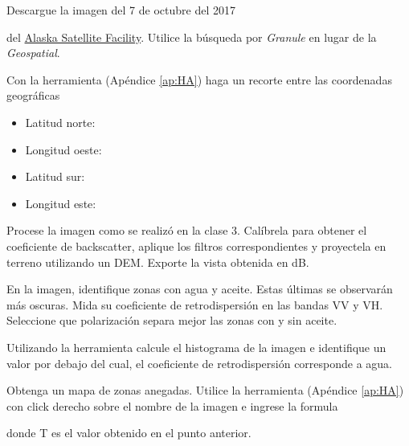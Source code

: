 \begin{que}
    Descargue la imagen del 7 de octubre del 2017
    \begin{center}\end{center} del \href{https://vertex.daac.asf.alaska.edu/}{Alaska Satellite Facility}. Utilice la búsqueda por \emph{Granule} en lugar de la \emph{Geospatial}.
\end{que}

\begin{que}
    Con la herramienta  (Apéndice \ref{ap:HA}) haga un recorte entre las coordenadas geográficas
    \begin{itemize}
        \item Latitud norte:
        \item Longitud oeste:
        \item Latitud sur:
        \item Longitud este:
    \end{itemize}

\end{que}

\begin{que}
    Procese la imagen como se realizó en la clase 3. Calíbrela para obtener el coeficiente de backscatter, aplique los filtros correspondientes y proyectela en terreno utilizando un DEM. Exporte la vista obtenida en dB.
\end{que}

\begin{que}
    En la imagen, identifique zonas con agua y aceite. Estas últimas se observarán más oscuras. Mida su coeficiente de retrodispersión en las bandas VV y VH. Seleccione que polarización separa mejor las zonas con y sin aceite.
\end{que}


\begin{que}
    Utilizando la herramienta  calcule el histograma de la imagen e identifique un valor por debajo del cual, el coeficiente de retrodispersión corresponde a agua.
\end{que}

\begin{que}
  Obtenga un mapa de zonas anegadas. Utilice la herramienta  (Apéndice \ref{ap:HA}) con click derecho sobre el nombre de la imagen e ingrese la formula
  \begin{center}
  \end{center}
  donde T es el valor obtenido en el punto anterior.
\end{que}

